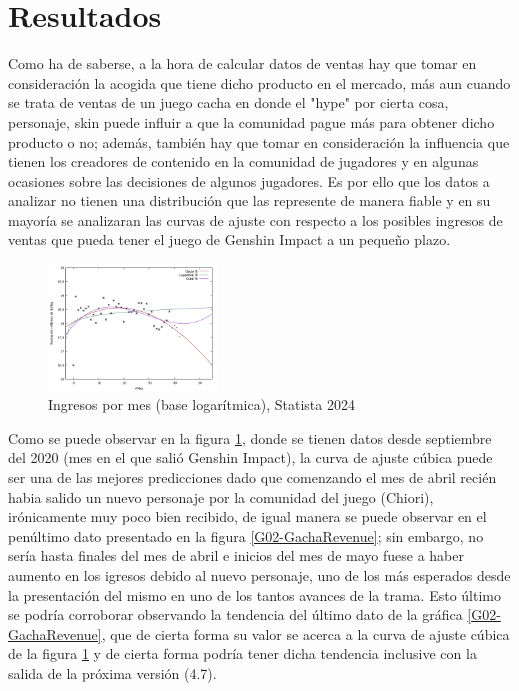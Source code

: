 \documentclass[osajnl,twocolumn,showpacs,superscriptaddress,10pt]{revtex4-2}
\begin{document}
\section{Resultados}
Como ha de saberse, a la hora de calcular datos de ventas hay que tomar en consideración la acogida que tiene dicho producto en el mercado, más aun cuando se trata de ventas de un juego cacha en donde el "hype" por cierta cosa, personaje, skin puede influir a que la comunidad pague más para obtener dicho producto o no; además, también hay que tomar en consideración la influencia que tienen los creadores de contenido en la comunidad de jugadores y en algunas ocasiones sobre las decisiones de algunos jugadores. Es por ello que los datos a analizar no tienen una distribución que las represente de manera fiable y en su mayoría se analizaran las curvas de ajuste con respecto a los posibles ingresos de ventas que pueda tener el juego de Genshin Impact a un pequeño plazo.
\begin{figure}[H]
    \begin{center}
        \includegraphics[width=0.4\textwidth]{img/GIRev01.pdf}
        \caption{\label{G01-statista}Ingresos por mes (base logarítmica), Statista 2024}
    \end{center}
\end{figure}
Como se puede observar en la figura \ref{G01-statista}, donde se tienen datos desde septiembre del 2020 (mes en el que salió Genshin Impact), la curva de ajuste cúbica puede ser una de las mejores predicciones dado que comenzando el mes de abril recién habia salido un nuevo personaje por la comunidad del juego (Chiori), irónicamente muy poco bien recibido, de igual manera se puede observar en el penúltimo dato presentado en la figura \ref{G02-GachaRevenue}; sin embargo, no sería hasta finales del mes de abril e inicios del mes de mayo fuese a haber aumento en los igresos debido al nuevo personaje, uno de los más esperados desde la presentación del mismo en uno de los tantos avances de la trama. Esto último se podría corroborar observando la tendencia del último dato de la gráfica \ref{G02-GachaRevenue}, que de cierta forma su valor se acerca a la curva de ajuste cúbica de la figura \ref{G01-statista} y de cierta forma podría tener dicha tendencia inclusive con la salida de la próxima versión (4.7).
\end{document}
